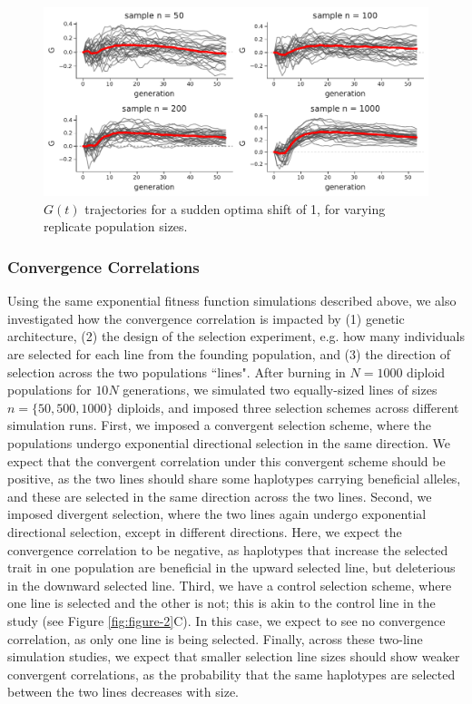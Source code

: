 \documentclass[11pt]{article}
\begin{document}
{\begin{figure}[!ht]
  \centering
  \includegraphics[width=\textwidth]{figures/gss-G-sampleN.pdf}

  \caption{$G(t)$ trajectories for a sudden optima shift of 1, for varying
  replicate population sizes.}

  \label{suppfig:gss-G-sampleN}
\end{figure}


\subsubsection{Convergence Correlations}

Using the same exponential fitness function simulations described above, we
also investigated how the convergence correlation is impacted by (1) genetic
architecture, (2) the design of the selection experiment, e.g. how many
individuals are selected for each line from the founding population, and (3)
the direction of selection across the two populations ``lines". After burning
in $N = 1000$ diploid populations for $10N$ generations, we simulated two
equally-sized lines of sizes $n = \{50, 500, 1000\}$ diploids, and imposed
three selection schemes across different simulation runs. First, we imposed a
convergent selection scheme, where the populations undergo exponential
directional selection in the same direction. We expect that the convergent
correlation under this convergent scheme should be positive, as the two lines
should share some haplotypes carrying beneficial alleles, and these are
selected in the same direction across the two lines. Second, we imposed
divergent selection, where the two lines again undergo exponential directional
selection, except in different directions. Here, we expect the convergence
correlation to be negative, as haplotypes that increase the selected trait in
one population are beneficial in the upward selected line, but deleterious in
the downward selected line. Third, we have a control selection scheme, where
one line is selected and the other is not; this is akin to the control line in
the \textcite{Castro2019-uk} study (see Figure \ref{fig:figure-2}C). In this
case, we expect to see no convergence correlation, as only one line is being
selected. Finally, across these two-line simulation studies, we expect that
smaller selection line sizes should show weaker convergent correlations, as the
probability that the same haplotypes are selected between the two lines
decreases with size.

}
\end{document}
